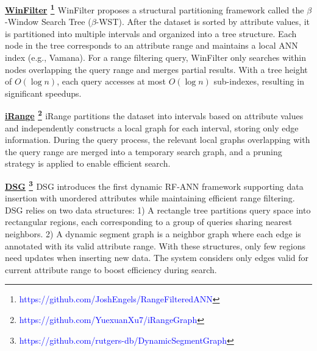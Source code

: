 \documentclass[sigconf, nonacm]{acmart}
\begin{document}
{	\noindent\textbf{\underline{WinFilter} \footnote{\textcolor{blue}{https://github.com/JoshEngels/RangeFilteredANN}} \cite{winFilter}}
	WinFilter proposes a structural partitioning framework called the $\beta$-Window Search Tree ($\beta$-WST). After the dataset is sorted by attribute values, it is partitioned into multiple intervals and organized into a tree structure. Each node in the tree corresponds to an attribute range and maintains a local ANN index (e.g., Vamana). For a range filtering query, WinFilter only searches within nodes overlapping the query range and merges partial results. With a tree height of $O(\log n)$, each query accesses at most $O(\log n)$ sub-indexes, resulting in significant speedups.
	
	\noindent\textbf{\underline{iRange} \footnote{\textcolor{blue}{https://github.com/YuexuanXu7/iRangeGraph}} \cite{iRangeGraph}}
	iRange partitions the dataset into intervals based on attribute values and independently constructs a local graph for each interval, storing only edge information. During the query process, the relevant local graphs overlapping with the query range are merged into a temporary search graph, and a pruning strategy is applied to enable efficient search.
	
	\noindent\textbf{\underline{DSG} \footnote{\textcolor{blue}{https://github.com/rutgers-db/DynamicSegmentGraph}} \cite{DSG}}
	DSG introduces the first dynamic RF-ANN framework supporting data insertion with unordered attributes while maintaining efficient range filtering.
	DSG relies on two data structures: 1) A rectangle tree partitions query space into rectangular regions, each corresponding to a group of queries sharing nearest neighbors. 2) A dynamic segment graph is a neighbor graph where each edge is annotated with its valid attribute range.
	With these structures, only few regions need updates when inserting new data. The system considers only edges valid for current attribute range to boost efficiency during search.
	
}
\end{document}
